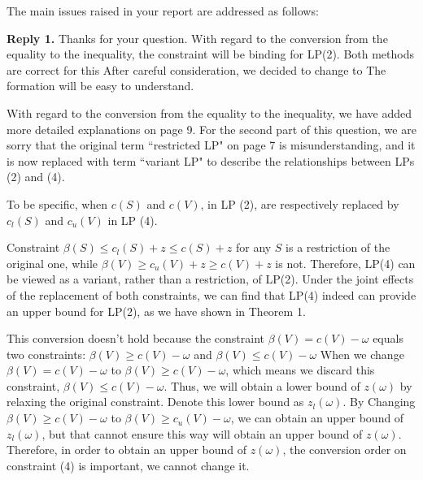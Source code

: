 \documentclass[11pt]{article}
\begin{document}
The main issues raised in your report are addressed as follows:
\\[4mm]
%
%

\noindent \textbf{Reply 1.}
Thanks for your question. With regard to the conversion from the equality to the inequality, the constraint will be binding for LP(2). Both methods are correct for this
After careful consideration, we decided to change to
The formation will be easy to understand.

With regard to the conversion from the equality to the inequality, we have added more detailed explanations on page 9. For the second part of this question, we are sorry that the original term ``restricted LP" on page 7 is misunderstanding, and it is now replaced with term ``variant LP" to describe the relationships between LPs (2) and (4).

To be specific, when $c(S)$ and $c(V)$, in LP (2), are respectively replaced by $c_l(S)$ and $c_u(V)$ in LP (4).

Constraint $\beta(S) \leq c_l(S) + z \leq c(S) + z$ for any $S$ is a restriction of the original one, while
$\beta(V) \geq c_u(V) + z \geq c(V) + z$ is not.
Therefore, LP(4) can be viewed as a variant, rather than a restriction, of LP(2).
Under the joint effects of the replacement of both constraints, we can find that LP(4) indeed can provide an upper bound for LP(2), as we have shown in Theorem 1.

This conversion doesn't hold because
the constraint $\beta(V) = c(V) - \omega$ equals two constraints: $\beta(V) \geq c(V) - \omega$ and $\beta(V) \leq c(V) - \omega$
When we change $\beta(V) = c(V) - \omega$ to $\beta(V) \geq c(V) - \omega$, which means we discard this constraint, $\beta(V) \leq c(V) - \omega$. Thus, we will obtain a lower bound of $z(\omega)$ by relaxing the original constraint. Denote this lower bound as $z_l(\omega)$. By Changing $\beta(V) \geq c(V) - \omega$ to $\beta(V) \geq c_u(V) - \omega$, we can obtain an upper bound of $z_l(\omega)$, but that cannot ensure this way will obtain an upper bound of $z(\omega)$.
Therefore, in order to obtain an upper bound of $z(\omega)$, the conversion order on constraint (4) is important, we cannot change it.
\end{document}
